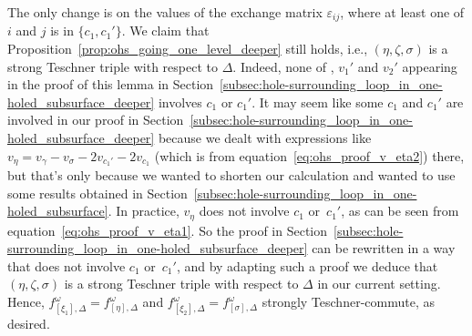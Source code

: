 \documentclass[10pt,a4paper]{amsart}
\numberwithin{equation}{section}
\theoremstyle{definition}
\begin{document}
The only change is on the values of the exchange matrix $\varepsilon_{ij}$, where at least one of $i$ and $j$ is in $\{c_1,c_1'\}$. We claim that Proposition~\ref{prop:ohs_going_one_level_deeper} still holds, i.e., $(\eta,\zeta,\sigma)$ is a strong Teschner triple with respect to $\Delta$. Indeed, none of , $v_1'$ and $v_2'$ appearing in the proof of this lemma in Section~\ref{subsec:hole-surrounding_loop_in_one-holed_subsurface_deeper} involves $c_1$ or $c_1'$. It may seem like some $c_1$ and $c_1'$ are involved in our proof in Section~\ref{subsec:hole-surrounding_loop_in_one-holed_subsurface_deeper} because we dealt with expressions like $v_\eta = v_\gamma - v_\sigma - 2v_{c_1'} - 2v_{c_1}$ (which is from equation~\eqref{eq:ohs_proof_v_eta2}) there, but that's only because we wanted to shorten our calculation and wanted to use some results obtained in Section~\ref{subsec:hole-surrounding_loop_in_one-holed_subsurface}. In practice, $v_\eta$ does not involve $c_1$ or~$c_1'$, as can be seen from equation~\eqref{eq:ohs_proof_v_eta1}. So the proof in Section~\ref{subsec:hole-surrounding_loop_in_one-holed_subsurface_deeper} can be rewritten in a way that does not involve $c_1$ or~$c_1'$, and by adapting such a proof we deduce that $(\eta,\zeta,\sigma)$ is a strong Teschner triple with respect to $\Delta$ in our current setting. Hence, $f^\omega_{[\xi_1],\Delta} = f^\omega_{[\eta],\Delta}$ and $f^\omega_{[\xi_2],\Delta} = f^\omega_{[\sigma],\Delta}$ strongly Teschner-commute, as desired.
\end{document}
